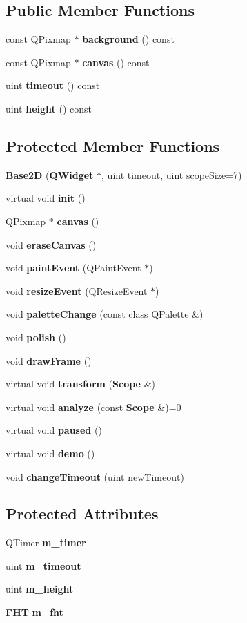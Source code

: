\subsection*{Public Member Functions}
\begin{CompactItemize}
\item 
const QPixmap $\ast$ {\bf background} () const 
\item 
const QPixmap $\ast$ {\bf canvas} () const 
\item 
uint {\bf timeout} () const
\item 
uint {\bf height} () const
\end{CompactItemize}
\subsection*{Protected Member Functions}
\begin{CompactItemize}
\item 
{\bf Base2D} ({\bf QWidget} $\ast$, uint timeout, uint scope\-Size=7)
\item 
virtual void {\bf init} ()
\item 
QPixmap $\ast$ {\bf canvas} ()
\item 
void {\bf erase\-Canvas} ()
\item 
void {\bf paint\-Event} (QPaint\-Event $\ast$)
\item 
void {\bf resize\-Event} (QResize\-Event $\ast$)
\item 
void {\bf palette\-Change} (const class QPalette \&)
\item 
void {\bf polish} ()
\item 
void {\bf draw\-Frame} ()
\item 
virtual void {\bf transform} ({\bf Scope} \&)
\item 
virtual void {\bf analyze} (const {\bf Scope} \&)=0
\item 
virtual void {\bf paused} ()
\item 
virtual void {\bf demo} ()
\item 
void {\bf change\-Timeout} (uint new\-Timeout)
\end{CompactItemize}
\subsection*{Protected Attributes}
\begin{CompactItemize}
\item 
QTimer {\bf m\_\-timer}
\item 
uint {\bf m\_\-timeout}
\item 
uint {\bf m\_\-height}
\item 
{\bf FHT} {\bf m\_\-fht}
\end{CompactItemize}
